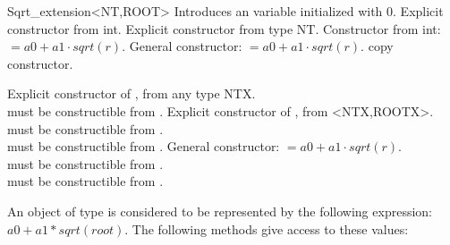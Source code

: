 \begin{ccRefClass}{Sqrt_extension<NT,ROOT>}
\ccCreation
{}
        {Introduces an variable initialized with 0.}
        {Explicit constructor from int.}
        {Explicit constructor from type NT.}
 	{Constructor from int: \ccVar $= a0 +a1 \cdot sqrt(r)$.}
 	{General constructor: \ccVar $= a0 + a1 \cdot sqrt(r)$.}
 	{copy constructor.}

\begin{ccAdvanced}
        {Explicit constructor of , from any type NTX.\\
          must be constructible from .}
        {Explicit constructor of , from <NTX,ROOTX>.\\
            must be constructible from .\\
            must be constructible from .}
        {General constructor: \ccVar $= a0 + a1 \cdot sqrt(r)$.\\
          must be constructible from .\\
          must be constructible from .}
\end{ccAdvanced}

\ccOperations

An object of type  is considered to be 
represented by the following expression: $a0 + a1 * sqrt(root)$. 
The following methods give access to these values:

 \ccGlue
{}\ccGlue
{}\ccGlue


\end{ccRefClass}
